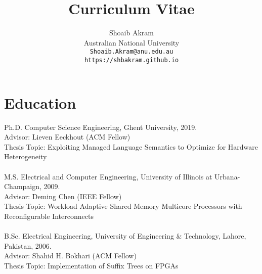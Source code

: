 \documentclass[singlecolumn,singlespace,11pt]{article}
\begin{document}
\title{ { \bfseries Curriculum Vitae} }
\author{Shoaib Akram\\
	Australian National University \\
        \texttt{Shoaib.Akram@anu.edu.au} \\
        \texttt{https://shbakram.github.io}
       }
\date{}
\maketitle

\section*{Education}
\noindent Ph.D. Computer Science Engineering, Ghent University, 2019. \\
Advisor: Lieven Eeckhout (ACM Fellow)  \\
Thesis Topic: Exploiting Managed Language Semantics to Optimize for Hardware Heterogeneity
\\
\\
\noindent M.S. Electrical and Computer Engineering, University of Illinois at Urbana-Champaign, 2009. \\
Advisor: Deming Chen (IEEE Fellow) \\
Thesis Topic: Workload Adaptive Shared Memory Multicore Processors with Reconfigurable Interconnects
\\
\\
\noindent B.Sc. Electrical Engineering, University of Engineering \& Technology, Lahore, Pakistan, 2006.\\
Advisor: Shahid H. Bokhari (ACM Fellow) \\
Thesis Topic: Implementation of Suffix Trees on FPGAs 
\end{document}
